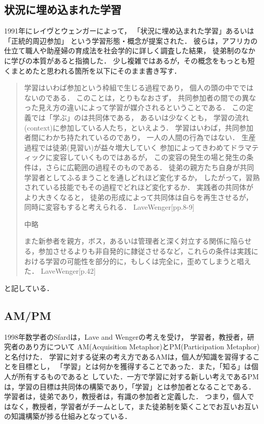 \documentclass{jsarticle}
\begin{document}
\subsection{状況に埋め込まれた学習}
\label{sec:org824ca5d}
1991年にレイヴとウェンガーによって，
  「状況に埋め込まれた学習」あるいは「正統的周辺参加」
  という学習形態・概念が提案された．
  彼らは，アフリカの仕立て職人や助産婦の育成法を社会学的に詳しく調査した結果，
  徒弟制のなかに学びの本質があると指摘した．
少し複雑ではあるが，その概念をもっとも短くまとめたと思われる箇所を以下にそのまま書き写す．
\begin{quote}
学習はいわば参加という枠組で生じる過程であり，
個人の頭の中でではないのである．
このことは，とりもなおさず，
共同参加者の間での異なった見え方の違いによって学習が媒介されるということである．
この定義では「学ぶ」のは共同体である，
あるいは少なくとも，
学習の流れ(context)に参加している人たち，といえよう．
学習はいわば，共同参加者間にわかち持たれているのであり，
一人の人間の行為ではない．
生産過程では徒弟(見習い)が益々増大していく
参加によってきわめてドラマティックに変容していくものではあるが，
この変容の発生の場と発生の条件は，さらに広範囲の過程そのものである．
徒弟の親方たち自身が共同学習者としてふるまうことを通しどれほど変化するか，
したがって，習熟されている技能でもその過程でどれほど変化するか．
実践者の共同体がより大きくなると，
徒弟の形成によって共同体は自らを再生させるが，
同時に変容もすると考えられる．
LaveWenger[pp.8-9]

中略

また新参者を親方，ボス，あるいは管理者と深く対立する関係に陥らせる，参加させるよりも非自発的に隷従させるなど，これらの条件は実践における学習の可能性を部分的に，もしくは完全に，歪めてしまうと唱えた．
 LaveWenger[p.42]
\end{quote}
と記している．

\subsection{AM/PM}
\label{sec:orga31c0fa}
1998年数学者のSfardは，Lave and Wengerの考えを受け，
学習者，教授者，研究者のあり方について
AM(Acquisition Metaphor)とPM(Participation Metaphor)と名付けた．
学習に対する従来の考え方であるAMは，個人が知識を習得することを目標とし，
「学習」とは何かを獲得することであった．また，「知る」は個人が所有するものであると
していた．一方で学習に対する新しい考えであるPMは，学習の目標は共同体の構築であり，「学習」とは参加者となることである．学習者は，徒弟であり，教授者は，有識の参加者と定義した．
つまり，個人ではなく，教授者，学習者がチームとして，また徒弟制を築くことでお互いお互いの知識構築が捗る仕組みとなっている．
\end{document}
